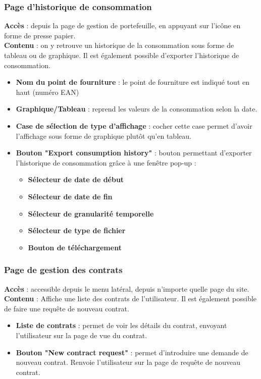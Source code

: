 \documentclass[../rapport.tex]{subfiles}
\begin{document}
\subsubsection{Page d'historique de consommation}
\noindent \textbf{Accès} : depuis la page de gestion de portefeuille, en appuyant sur l'icône en forme de presse papier. \\
\textbf{Contenu} : on y retrouve un historique de la consommation sous forme de tableau ou de graphique. Il est également possible d'exporter l'historique de consommation.
\begin{itemize}
    \item \textbf{Nom du point de fourniture} : le point de fourniture est indiqué tout en haut (numéro EAN)
    \item \textbf{Graphique/Tableau} : reprend les valeurs de la consommation selon la date. 
    \item \textbf{Case de sélection de type d'affichage} : cocher cette case permet d'avoir l'affichage sous forme de graphique plutôt qu'en tableau.
    \item \textbf{Bouton "Export consumption history"} : bouton permettant d'exporter l'historique de consommation grâce à une fenêtre pop-up :
        \begin{itemize}
            \item \textbf{Sélecteur de date de début}
            \item \textbf{Sélecteur de date de fin}
            \item \textbf{Sélecteur de granularité temporelle}
            \item \textbf{Sélecteur de type de fichier}
            \item \textbf{Bouton de téléchargement}
        \end{itemize}
\end{itemize}

\subsubsection{Page de gestion des contrats}
\noindent \textbf{Accès} : accessible depuis le menu latéral, depuis n'importe quelle page du site. \\
\textbf{Contenu} :  Affiche une liste des contrats de l'utilisateur. Il est également possible de faire une requête de nouveau contrat.
\begin{itemize}
    \item \textbf{Liste de contrats} : permet de voir les détails du contrat, envoyant l'utilisateur sur la page de vue du contrat.
    \item \textbf{Bouton "New contract request"} : permet d'introduire une demande de nouveau contrat. Renvoie l'utilisateur sur la page de requête de nouveau contrat.
\end{itemize}
\end{document}
